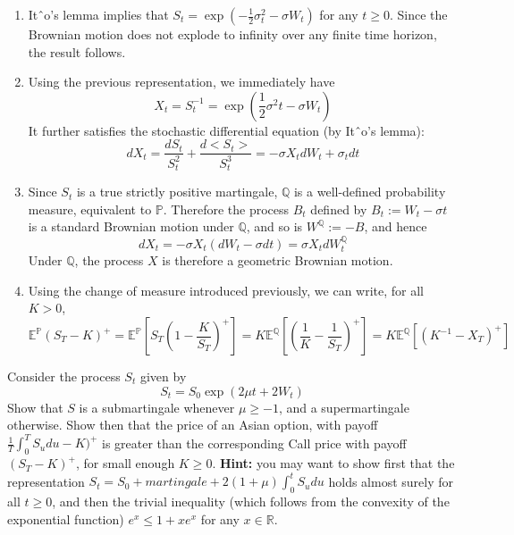 \documentclass[12pt,a4paper]{exam}
\begin{document}
\begin{questions}
\begin{solution}
\begin{solution}
\begin{solution}
\begin{enumerate}[label=(\alph*),font=\itshape]
\item Itˆo’s lemma implies that $S_t = \exp (-\frac{1}{2}\sigma^2_t - \sigma W_t)$ for any $t \geq 0$. Since the Brownian motion does not
explode to infinity over any finite time horizon, the result follows.
\item Using the previous representation, we immediately have
\begin{equation*}
X_t = S_t^{-1} = \exp\left(\frac{1}{2}\sigma^2 t - \sigma W_t\right)
\end{equation*}
It further satisfies the stochastic differential equation (by Itˆo’s lemma):
\begin{equation*}
dX_t = \frac{dS_t}{S_t^2} + \frac{d<S_t>}{S_t^3} = -\sigma X_t dW_t + \sigma_t dt
\end{equation*}
\item Since $S_t$ is a true strictly positive martingale, $\mathbb{Q}$ is a well-defined probability measure, equivalent to $\mathbb{P}$.
Therefore the process $B_t$ defined by $B_t := W_t - \sigma t$ is a standard Brownian motion under $\mathbb{Q}$, and so is $W^{\mathbb{Q}} := -B$, and hence 
\begin{equation*}
dX_t = -\sigma X_t(dW_t - \sigma dt) = \sigma X_t dW_t^{\mathbb{Q}}
\end{equation*}
Under $\mathbb{Q}$, the process $X$ is therefore a geometric Brownian motion.
\item Using the change of measure introduced previously, we can write, for all $K>0$,
\begin{equation*}
\mathbb{E}^{\mathbb{P}}(S_T-K)^+ = \mathbb{E}^{\mathbb{P}}\left[S_T\left(1-\frac{K}{S_T}\right)^+\right] = K \mathbb{E}^{\mathbb{Q}}\left[\left(\frac{1}{K}-\frac{1}{S_T}\right)^+\right] = K\mathbb{E}^{\mathbb{Q}}\left[(K^{-1}-X_T)^+\right]
\end{equation*}
\end{enumerate}
\end{solution}

\question Consider the process $S_t$ given by
\begin{equation*}
S_t = S_0\exp(2\mu t + 2W_t)
\end{equation*}
Show that $S$ is a submartingale whenever $\mu\geq -1$, and a supermartingale otherwise. Show then that the price of an Asian option, with payoff $\frac{1}{T}\int_0^T S_u du - K)^+$ is greater than the corresponding Call price with payoff $(S_T-K)^+$, for small enough $K\geq 0$.
\textbf{Hint:} you may want to show first that the representation $S_t = S_0 + martingale + 2(1 + \mu)\int_0^t S_u du$  holds almost surely for all $t \geq 0$, and then the trivial inequality (which follows from the convexity of the exponential function) $e^x \leq 1 + xe^x$ for any $x \in\mathbb{R}$.
\fillwithlines{3cm}


\end{solution}
\end{solution}
\end{questions}
\end{document}
